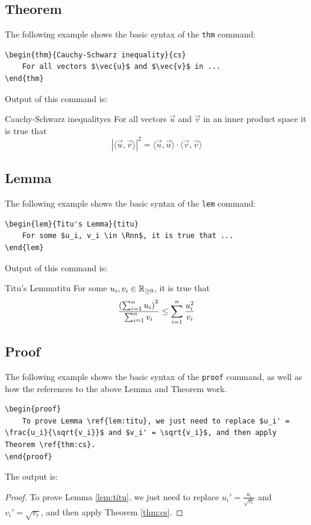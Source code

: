 \documentclass[letterpaper,11pt]{notes}
\theoremstyle{definition}
\theoremstyle{plain}
\theoremstyle{remark}
\begin{document}
\subsection{Theorem}
The following example shows the basic syntax of the \texttt{thm} command:
\begin{verbatim}
\begin{thm}{Cauchy-Schwarz inequality}{cs}
    For all vectors $\vec{u}$ and $\vec{v}$ in ...
\end{thm}
\end{verbatim}
Output of this command is:

\begin{thm}{Cauchy-Schwarz inequality}{cs}
For all vectors $\vec{u}$ and $\vec{v}$ in an inner product space it is true that
\begin{equation}
    \left|\langle\vec{u}, \vec{v}\rangle\right|^2 = \langle\vec{u}, \vec{u} \rangle \cdot \langle\vec{v}, \vec{v} \rangle 
\end{equation}
\end{thm}

\subsection{Lemma}
The following example shows the basic syntax of the \texttt{lem} command:
\begin{verbatim}
\begin{lem}{Titu's Lemma}{titu}
    For some $u_i, v_i \in \Rnn$, it is true that ...
\end{lem}
\end{verbatim}
Output of this command is:
\begin{lem}{Titu's Lemma}{titu}
For some $u_i, v_i \in \mathbb{R}_{\geq 0}$, it is true that
\begin{equation}
    \frac{\left(\sum_{i=1}^n u_i\right)^2}{\sum_{i=1}^n v_i} \leq \sum_{i=1}^n \frac{u_i^2}{v_i}
\end{equation}
\end{lem}

\subsection{Proof}
The following example shows the basic syntax of the \texttt{proof} command, as well as how the references to the above Lemma and Theorem work.
\begin{verbatim}
\begin{proof}
    To prove Lemma \ref{lem:titu}, we just need to replace $u_i' = \frac{u_i}{\sqrt{v_i}}$ and $v_i' = \sqrt{v_i}$, and then apply Theorem \ref{thm:cs}. 
\end{proof}
\end{verbatim}
The output is:
\begin{proof}
To prove Lemma \ref{lem:titu}, we just need to replace $u_i' = \frac{u_i}{\sqrt{v_i}}$ and $v_i' = \sqrt{v_i}$, and then apply Theorem \ref{thm:cs}. 
\end{proof}
\end{document}
